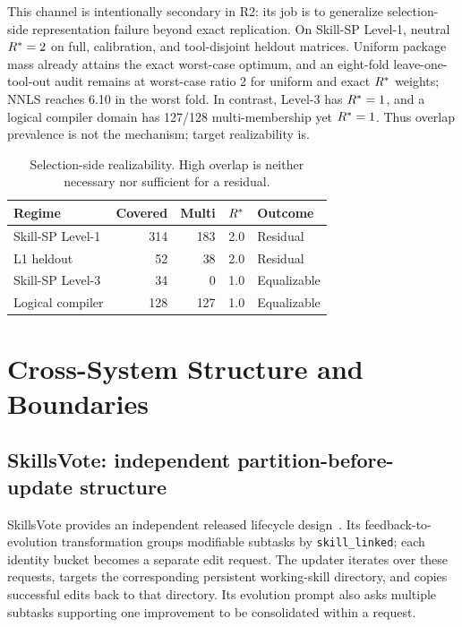 This channel is intentionally secondary in R2: its job is to generalize selection-side representation failure beyond exact replication. On Skill-SP Level-1, neutral $R^*=2$ on full, calibration, and tool-disjoint heldout matrices. Uniform package mass already attains the exact worst-case optimum, and an eight-fold leave-one-tool-out audit remains at worst-case ratio 2 for uniform and exact $R^*$ weights; NNLS reaches 6.10 in the worst fold. In contrast, Level-3 has $R^*=1$, and a logical compiler domain has 127/128 multi-membership yet $R^*=1$. Thus overlap prevalence is not the mechanism; target realizability is.

\begin{table}[t]
\centering
\caption{Selection-side realizability. High overlap is neither necessary nor sufficient for a residual.}
\label{tab:selection-boundary}
\small
\setlength{\tabcolsep}{4pt}
\begin{tabular}{lrrrl}
\toprule
Regime & Covered & Multi & $R^*$ & Outcome\\
\midrule
Skill-SP Level-1 & 314 & 183 & 2.0 & Residual\\
L1 heldout & 52 & 38 & 2.0 & Residual\\
Skill-SP Level-3 & 34 & 0 & 1.0 & Equalizable\\
Logical compiler & 128 & 127 & 1.0 & Equalizable\\
\bottomrule
\end{tabular}
\end{table}

\section{Cross-System Structure and Boundaries}

\subsection{SkillsVote: independent partition-before-update structure}

SkillsVote provides an independent released lifecycle design~\citep{liu2026skillsvote}. Its feedback-to-evolution transformation groups modifiable subtasks by \texttt{skill\_linked}; each identity bucket becomes a separate edit request. The updater iterates over these requests, targets the corresponding persistent working-skill directory, and copies successful edits back to that directory. Its evolution prompt also asks multiple subtasks supporting one improvement to be consolidated within a request.

